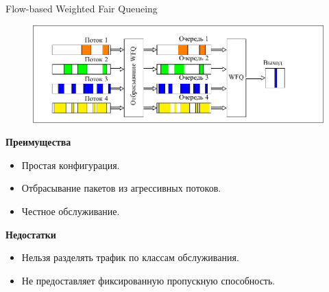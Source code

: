 \documentclass[12pt]{beamer}
\begin{document}
\begin{frame}{Flow-based Weighted Fair Queueing}
	\begin{figure}
		\center
    	\includegraphics[scale=0.6]{../text/src/pdfimages/fwfq.pdf}
	\end{figure}
	\begin{center}
        {\footnotesize
            \begin{multicols}{2}
				{\bf Преимущества}
				\begin{itemize}
					\item Простая конфигурация.
					\item Отбрасывание пакетов из агрессивных потоков.
					\item Честное обслуживание.
				\end{itemize}
            \columnbreak
				{\bf Недостатки}
				\begin{itemize}
					\item Нельзя разделять трафик по классам обслуживания.
					\item Не предоставляет фиксированную пропускную способность.
				\end{itemize}
            \end{multicols}
		}
	\end{center}
\end{frame}
\end{document}
